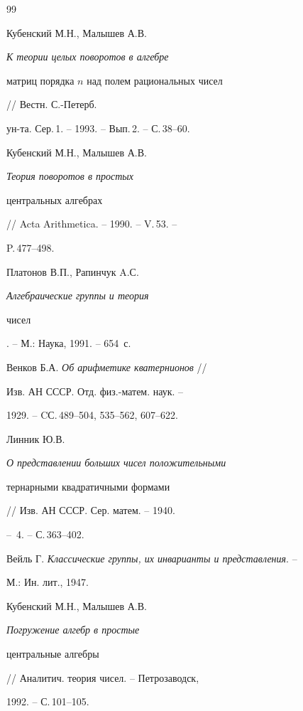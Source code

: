 \begin{thebibliography}{99} 


 




Кубенский М.Н., Малышев А.В. {\em К теории целых поворотов в алгебре 


матриц порядка $n$ над полем рациональных чисел} // Вестн. С.-Петерб. 


ун-та. Сер.\,1. -- 1993. -- Вып.\,2. -- С.\,38--60. 




Кубенский М.Н., Малышев А.В. {\em Теория поворотов в простых 


центральных алгебрах} // Acta Arithmetica. -- 1990. -- V.\,53. -- 


P.\,477--498. 




Платонов В.П., Рапинчук A.С. {\em Алгебраические группы и теория 


чисел}. -- М.: Наука, 1991. -- 654~с. 




Венков Б.А. {\em Об арифметике кватернионов} //


Изв. АН СССР. Отд. физ.-матем. наук. -- 


1929. -- CС.\,489--504, 535--562, 607--622. 




Линник Ю.В. {\em О представлении больших чисел положительными 


тернарными квадратичными формами} // Изв. АН СССР. Сер. матем. -- 1940. 


-- \No\,4. -- С.\,363--402. 




Вейль Г. {\em Классические группы, их инварианты и представления}. -- 


М.: Ин. лит., 1947.




Кубенский М.Н., Малышев А.В. {\em Погружение алгебр в простые 


центральные алгебры} // Аналитич. теория чисел. -- Петрозаводск, 


1992. -- С.\,101--105. 


 


 


\end{thebibliography} 


 


\vskip 2cm 


 








\label{end} 


 



